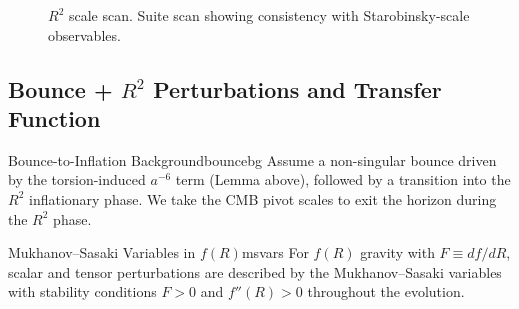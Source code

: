 \begin{figure}[H]
\centering
{}
\caption{$R^2$ scale scan. Suite scan showing consistency with Starobinsky-scale observables.}
\label{fig:r2-scan}
\end{figure}

\subsection{\texorpdfstring{Bounce + $R^2$ Perturbations and Transfer Function}{Bounce + R2 Perturbations and Transfer Function}}
\label{sec:bounce}

\begin{definition}{Bounce-to-Inflation Background}{bouncebg}
Assume a non-singular bounce driven by the torsion-induced $a^{-6}$ term
(Lemma above), followed by a transition into the $R^2$ inflationary phase.
We take the CMB pivot scales to exit the horizon during the $R^2$ phase.
\end{definition}

\begin{definition}{Mukhanov--Sasaki Variables in $f(R)$}{msvars}
For $f(R)$ gravity with $F \equiv df/dR$, scalar and tensor perturbations are
described by the Mukhanov--Sasaki variables with stability conditions
$F>0$ and $f''(R)>0$ throughout the evolution.
\end{definition}


